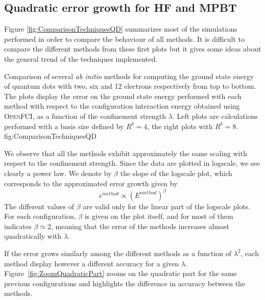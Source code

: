 \subsection{Quadratic error growth for HF and MPBT}
Figure \ref{fig:ComparisonTechniquesQD} summarizes most of the simulations performed in order to compare the behaviour of all methods. It is difficult to compare the different methods from these first plots but it gives some ideas about the general trend of the techniques implemented.

{Comparison of several \textit{ab initio} methods for computing the ground state energy of quantum dots with two, six and 12 electrons respectively from top to bottom. The plots display the error on the ground state energy performed with each method  with respect to the configuration interaction energy obtained using \textsc{OpenFCI}, as a function of the confinement strength $\lambda$. Left plots are calculations performed with a basis size defined by $R^b=4$, the right plots with $R^b=8$.}
{fig:ComparisonTechniquesQD}

We observe that all the methods exhibit approximately the same scaling with respect to the confinement strength.
Since the data are plotted in logscale, we see clearly a power law. We denote by $\beta$ the slope of the logscale plot, which corresponds to the approximated error growth given by
\begin{equation}
\epsilon^{method}\propto \left( E^{method} \right)^{\beta}
\end{equation} 
The different values of $\beta$ are valid only for the linear part of the logscale plots. For each configuration, $\beta$ is given on the plot itself, and for most of them indicates $\beta \simeq 2$, meaning that the error of the methods increases almost quadratically with $\lambda$.

If the error grows similarly among the different methods as a function of $\lambda^2$, each method display however a different accuracy for a given  $\lambda$. Figure~\ref{fig:ZoomQuadraticPart} zooms on the quadratic part for the same previous configurations and highlights the difference in accuracy between the methods.


